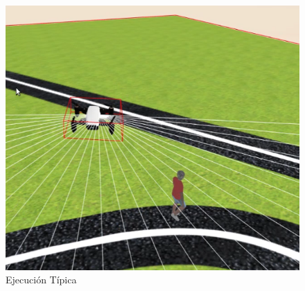 \begin{figure}[!htb]
    \includegraphics[width=\linewidth]{figures/simulado/comp_3.png}
\endminipage\hfill
\caption{Ejecución Típica}
\label{fig:ejecucion_sim}
\end{figure}


